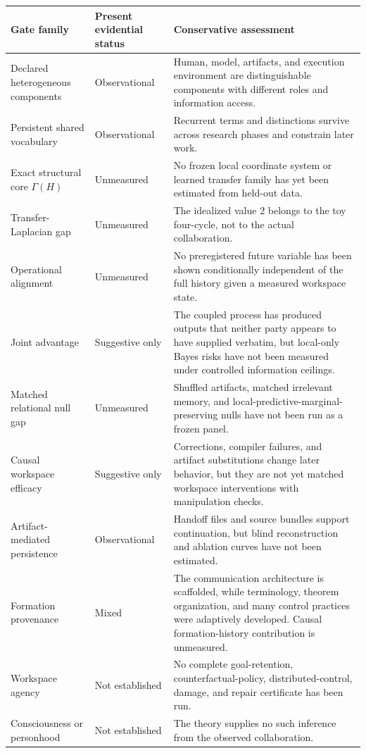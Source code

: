 \begin{center}
\small
\begin{tabularx}{\textwidth}{@{}>{\raggedright\arraybackslash}p{}>{\raggedright\arraybackslash}p{}>{\raggedright\arraybackslash}X@{}}
\toprule
Gate family & Present evidential status & Conservative assessment \\
\midrule
Declared heterogeneous components & Observational & Human, model, artifacts,
and execution environment are distinguishable components with different
roles and information access. \\
Persistent shared vocabulary & Observational & Recurrent terms and distinctions
survive across research phases and constrain later work. \\
Exact structural core \(\Gamma(H)\) & Unmeasured & No frozen local coordinate
system or learned transfer family has yet been estimated from held-out data. \\
Transfer-Laplacian gap & Unmeasured & The idealized value \(2\) belongs to the
toy four-cycle, not to the actual collaboration. \\
Operational alignment & Unmeasured & No preregistered future variable has been
shown conditionally independent of the full history given a measured workspace
state. \\
Joint advantage & Suggestive only & The coupled process has produced outputs
that neither party appears to have supplied verbatim, but local-only Bayes risks
have not been measured under controlled information ceilings. \\
Matched relational null gap & Unmeasured & Shuffled artifacts, matched irrelevant
memory, and local-predictive-marginal-preserving nulls have not been run as a
frozen panel. \\
Causal workspace efficacy & Suggestive only & Corrections, compiler failures,
and artifact substitutions change later behavior, but they are not yet matched
workspace interventions with manipulation checks. \\
Artifact-mediated persistence & Observational & Handoff files and source bundles
support continuation, but blind reconstruction and ablation curves have not
been estimated. \\
Formation provenance & Mixed & The communication architecture is scaffolded,
while terminology, theorem organization, and many control practices were
adaptively developed. Causal formation-history contribution is unmeasured. \\
Workspace agency & Not established & No complete goal-retention,
counterfactual-policy, distributed-control, damage, and repair certificate has
been run. \\
Consciousness or personhood & Not established & The theory supplies no such
inference from the observed collaboration. \\
\bottomrule
\end{tabularx}
\end{center}

